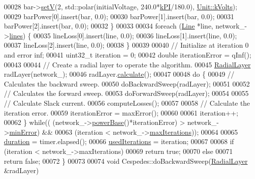 \begin{DoxyCode}
00028     bar->\hyperlink{group___models_ga8d1e70b2d11ed4245e81b8b20858079d}{setV}(2, std::polar(initialVoltage, 240.0*\hyperlink{math__constants_8h_a368d99984512d9a6c6f18b37b4446431}{kPI}/180.0), 
      \hyperlink{class_unit_a55b07dfa9457e1eca2c7194fe0cfc3c1aa54b2473993a702a3923525765bd6e4c}{Unit::kVolts});
00029     barPower[0].insert(bar, 0.0);
00030     barPower[1].insert(bar, 0.0);
00031     barPower[2].insert(bar, 0.0);
00032   \}
00033 
00034   \textcolor{keywordflow}{foreach} (\hyperlink{class_line}{Line} *line, network\_->\hyperlink{class_network_a49659f95d02baf087707c5a94fa23d90}{lines}) \{
00035     lineLoss[0].insert(line, 0.0);
00036     lineLoss[1].insert(line, 0.0);
00037     lineLoss[2].insert(line, 0.0);
00038   \}
00039 
00040   \textcolor{comment}{// Initialize at iteration 0 and error inf;}
00041   uint32\_t iteration = 0;
00042   \textcolor{keywordtype}{double} iterationError = qInf();
00043 
00044   \textcolor{comment}{// Create a radial layer to operate the algorithm.}
00045   \hyperlink{class_radial_layer}{RadialLayer} radLayer(network\_);
00046   radLayer.\hyperlink{class_radial_layer_a971680f24ba6c516afedbc49d8c22cab}{calculate}();
00047 
00048   \textcolor{keywordflow}{do} \{
00049     \textcolor{comment}{// Calculates the backward sweep.}
00050     doBackwardSweep(radLayer);
00051 
00052     \textcolor{comment}{// Calculates the forward sweep.}
00053     doForwardSweep(radLayer);
00054 
00055     \textcolor{comment}{// Calculate Slack current.}
00056     computeLosses();
00057 
00058     \textcolor{comment}{// Calculate the iteration error.}
00059     iterationError = maxError();
00060 
00061     iteration++;
00062   \} \textcolor{keywordflow}{while}(( (network\_->\hyperlink{group___models_ga6fdbd7d04d12a3f1215c92e2e20eabdb}{powerBase}()*iterationError) > network\_->\hyperlink{group___models_gabcdc973129d3dda7572b7a1c388da1b5}{minError}) &&
00063           (iteration < network\_->\hyperlink{group___models_ga318dee060bc577eacd67d332efbbe1b2}{maxIterations}));
00064 
00065   \hyperlink{class_cespedes_a815e35adbc446c937d164186a634b5a0}{duration} = timer.elapsed();
00066   \hyperlink{class_cespedes_a28bead7e9c77462986e1471c50294d9e}{usedIterations} = iteration;
00067 
00068   \textcolor{keywordflow}{if} (iteration < network\_->maxIterations)
00069     \textcolor{keywordflow}{return} \textcolor{keyword}{true};
00070   \textcolor{keywordflow}{else}
00071     \textcolor{keywordflow}{return} \textcolor{keyword}{false};
00072 \}
00073 
00074 \textcolor{keywordtype}{void} Cespedes::doBackwardSweep(\hyperlink{class_radial_layer}{RadialLayer} &radLayer)

\end{DoxyCode}
